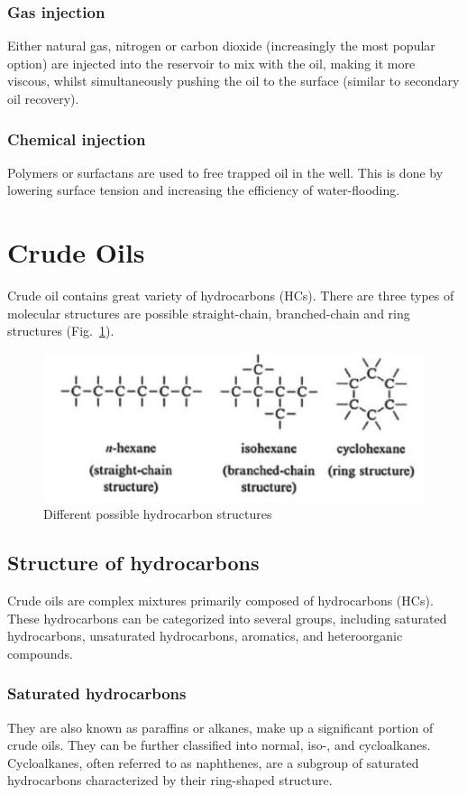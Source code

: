 \subsubsection{Gas injection}
Either natural gas, nitrogen or carbon dioxide (increasingly the most popular option) are injected into the reservoir to mix with the oil, making it more viscous, whilst simultaneously pushing the oil to the surface (similar to secondary oil recovery).

\subsubsection{Chemical injection}
Polymers or surfactans are used to free trapped oil in the well.
This is done by lowering surface tension and increasing the efficiency of water-flooding.

\section{Crude Oils}
\label{sec:crude_oils_and_products}
Crude oil contains great variety of hydrocarbons (HCs).
There are three types of molecular structures are possible straight-chain, branched-chain and ring structures (Fig.~\ref{fig:hc_structs}).

\begin{figure}[H]
    \centering
    \includegraphics{Figures/HC_structures}
    \caption{Different possible hydrocarbon structures}
    \label{fig:hc_structs}
\end{figure}

\subsection{Structure of hydrocarbons}
Crude oils are complex mixtures primarily composed of hydrocarbons (HCs).
These hydrocarbons can be categorized into several groups, including saturated hydrocarbons, unsaturated hydrocarbons, aromatics, and heteroorganic compounds.

\subsubsection{Saturated hydrocarbons} They are also known as paraffins or alkanes, make up a significant portion of crude oils.
They can be further classified into normal, iso-, and cycloalkanes.
Cycloalkanes, often referred to as naphthenes, are a subgroup of saturated hydrocarbons characterized by their ring-shaped structure.

